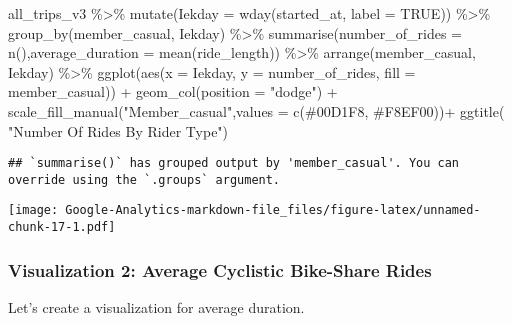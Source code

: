 \documentclass[
]{article}
\newenvironment{Shaded}{\begin{snugshade}}{\end{snugshade}}
\newcommand{\AttributeTok}[1]{\textcolor[rgb]{0.77,0.63,0.00}{#1}}
\newcommand{\ConstantTok}[1]{\textcolor[rgb]{0.00,0.00,0.00}{#1}}
\newcommand{\FunctionTok}[1]{\textcolor[rgb]{0.00,0.00,0.00}{#1}}
\newcommand{\NormalTok}[1]{#1}
\newcommand{\SpecialCharTok}[1]{\textcolor[rgb]{0.00,0.00,0.00}{#1}}
\newcommand{\StringTok}[1]{\textcolor[rgb]{0.31,0.60,0.02}{#1}}
\begin{document}
\begin{Shaded}
\begin{Highlighting}[]
\NormalTok{all\_trips\_v3 }\SpecialCharTok{\%\textgreater{}\%} 
  \FunctionTok{mutate}\NormalTok{(}\AttributeTok{Iekday =} \FunctionTok{wday}\NormalTok{(started\_at, }\AttributeTok{label =} \ConstantTok{TRUE}\NormalTok{)) }\SpecialCharTok{\%\textgreater{}\%} 
  \FunctionTok{group\_by}\NormalTok{(member\_casual, Iekday) }\SpecialCharTok{\%\textgreater{}\%} 
  \FunctionTok{summarise}\NormalTok{(}\AttributeTok{number\_of\_rides =} \FunctionTok{n}\NormalTok{(),}\AttributeTok{average\_duration =} \FunctionTok{mean}\NormalTok{(ride\_length)) }\SpecialCharTok{\%\textgreater{}\%}           
  \FunctionTok{arrange}\NormalTok{(member\_casual, Iekday)  }\SpecialCharTok{\%\textgreater{}\%} 
  \FunctionTok{ggplot}\NormalTok{(}\FunctionTok{aes}\NormalTok{(}\AttributeTok{x =}\NormalTok{ Iekday, }\AttributeTok{y =}\NormalTok{ number\_of\_rides, }\AttributeTok{fill =}\NormalTok{ member\_casual)) }\SpecialCharTok{+} \FunctionTok{geom\_col}\NormalTok{(}\AttributeTok{position =} \StringTok{"dodge"}\NormalTok{) }\SpecialCharTok{+}
  \FunctionTok{scale\_fill\_manual}\NormalTok{(}\StringTok{"Member\_casual"}\NormalTok{,}\AttributeTok{values =} \FunctionTok{c}\NormalTok{(}\StringTok{\textquotesingle{}\#00D1F8\textquotesingle{}}\NormalTok{, }\StringTok{\textquotesingle{}\#F8EF00\textquotesingle{}}\NormalTok{))}\SpecialCharTok{+}
  \FunctionTok{ggtitle}\NormalTok{( }\StringTok{"Number Of Rides By Rider Type"}\NormalTok{)}
\end{Highlighting}
\end{Shaded}

\begin{verbatim}
## `summarise()` has grouped output by 'member_casual'. You can override using the `.groups` argument.
\end{verbatim}

\texttt{[image: Google-Analytics-markdown-file\_files/figure-latex/unnamed-chunk-17-1.pdf]}

\hypertarget{visualization-2-average-cyclistic-bike-share-rides}{%
\subsubsection{Visualization 2: Average Cyclistic Bike-Share
Rides}\label{visualization-2-average-cyclistic-bike-share-rides}}

Let's create a visualization for average duration.
\end{document}

